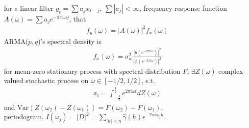 \documentclass[paper=a4, fontsize=11pt]{scrartcl} %
\numberwithin{equation}{section} %
\numberwithin{figure}{section} %
\numberwithin{table}{section} %
\def \var {\text{Var}}
\begin{document}
for a linear filter $y_t = \sum a_j x_{t-j}$, $\sum |a_j|<\infty$, frequency response function $A(\omega)=\sum a_j e^{-2\pi i\omega j}$, that
\begin{align}
	f_y(\omega) = |A(\omega)|^2 f_x(\omega)
\end{align}
ARMA($p,q$)'s spectral density is
\begin{align}
	f_x(\omega) = \sigma_w^2 \frac{|\theta(e^{-2\pi i \omega})|^2}{|\phi(e^{-2\pi i \omega})|^2}
\end{align}
for mean-zero stationary process with spectral distribution $F$, $\exists Z(\omega)$ complex-valued stochastic process on $\omega\in[-1/2,1/2]$, s.t.
\begin{align}
	x_t = \int_{-\frac{1}{2}}^{\frac{1}{2}} e^{2\pi i \omega t} dZ(\omega)
\end{align}
and $\var(Z(\omega_2) - Z(\omega_1)) = F(\omega_2)-F(\omega_1)$.\\
periodogram, $I(\omega_j)=|D|^2=\sum_{|h|<n}\widehat{\gamma}(h)e^{-2\pi i\omega_j h}$.
\end{document}
